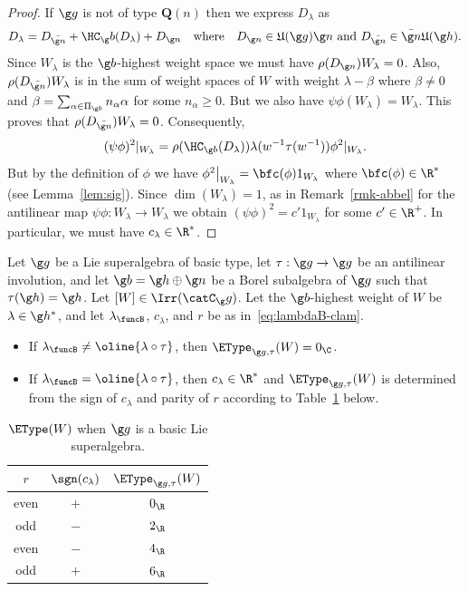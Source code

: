 \documentclass[12pt]{amsart}
\begin{document}
\begin{proof}
If $\g g$ is not of type $\mathbf Q(n)$ then we express $D_\lambda$ as 
\[
D_\lambda=D_{\bar{\g  n}}+\HC_\g b(D_\lambda)+D_{\g n}\quad\text{where}\quad D_{\g n}\in\mathfrak  U(\g g)\g n\text{ and }
D_{\bar{\g  n}}\in \bar{\g n}\mathfrak  U(\g h).
\]
Since $W_\lambda$ is the $\g b$-highest weight space we must have $\rho(D_{\g n})W_\lambda=0$. Also, 
$\rho(D_{\bar {\g n}})W_\lambda$
is in the sum of weight spaces of $W$ with weight  $\lambda-\beta$ where $\beta\neq 0$ and $\beta=\sum_{\alpha\in \Pi_{\g b}}n_\alpha \alpha$ for some $n_\alpha\geq 0$. 
But we also have $\psi\phi(W_\lambda)=W_\lambda$. This proves that $\rho(D_{\bar{\g n}})W_\lambda=0$. 
Consequently, 
\[
(\psi\phi)^2|_{W_\lambda}=\rho(\HC_{\g b}(D_\lambda))\lambda(w^{-1}\tau(w^{-1}))\phi^2|_{W_\lambda}. 
\]
 But  by the definition of $\phi$ we have $\phi^2\big|_{W_\lambda}=\bfc(\phi)1_{W_\lambda}$ where $\bfc(\phi)\in\R^*$ (see Lemma~\ref{lem:sig}). Since $\dim(W_\lambda)=1$, as in Remark~\ref{rmk-abbel} for the antilinear map $\psi\phi:W_\lambda\to W_\lambda$  we obtain $(\psi\phi)^2=c'1_{W_\lambda}$ for some $c'\in \R^+$. In particular, we must have $c_\lambda\in\R^*$. 
\end{proof}
\begin{thm}
\label{thm-endotypes-basic}
Let $\g g$ be a Lie superalgebra of basic type, let $\tau:\g g\to\g g$ be an antilinear involution, and let $\g b=\g h\oplus \g n$ be a Borel subalgebra of $\g g$ such that $\tau(\g h)=\g h$. Let $[W]\in\Irr(\catC_\g g)$. Let the $\g b$-highest weight of $W$ be $\lambda\in\g h^*$, and let $\lambda_\funcB$, $c_\lambda$, and $r$  be  as in~\eqref{eq:lambdaB-clam}.
\begin{itemize}
\item[\rm (i)] If $\lambda_\funcB\neq \oline{\lambda\circ\tau}$, then $\EType_{\g g,\tau}(W)=0_\C$.
\item[\rm (ii)] If $\lambda_\funcB= \oline{\lambda\circ\tau}$, then $c_\lambda\in \R^*$ and $\EType_{\g g,\tau}(W)$ is determined from the sign of $c_\lambda$ and parity of $r$ according to Table~\ref{Table-ETBasic} below.

\end{itemize}
\begin{table}[ht]
\centering
\begin{tabular}{|c|c|c|}
\hline 
$r$ & $\sgn(c_\lambda)$ & $\EType_{\g g,\tau}(W)$\\
 \hline 
\rm{even} & $+$ & $0_\R$\\
 \hline \rm{odd} & $-$ & $2_\R$\\
 \hline \rm{even} & $-$ & $4_\R$\\
 \hline \rm{odd} & $+$ & $6_\R$\\
 \hline
\end{tabular}
\vspace{3mm}
\caption{\label{Table-ETBasic} $\EType(W)$ when $\g g$ is a basic Lie superalgebra. }
\vspace{-8mm}
\end{table}
\end{thm}
\end{document}
